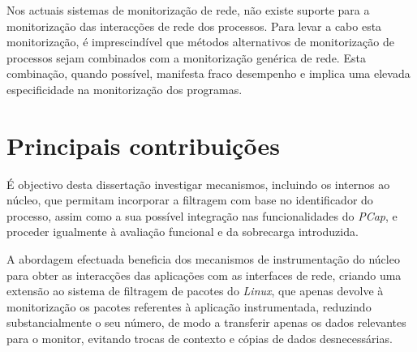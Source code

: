 Nos actuais sistemas de monitorização de rede, não existe suporte para a monitorização das interacções de rede dos processos.
Para levar a cabo esta monitorização, é imprescindível que métodos alternativos de monitorização de processos sejam combinados com a monitorização genérica de rede.
Esta combinação, quando possível, manifesta fraco desempenho e implica uma elevada especificidade na monitorização dos programas.



\section{Principais contribuições} 
\label{sec:intro_contribuicoes}

É objectivo desta dissertação investigar mecanismos, incluindo os internos ao núcleo, que permitam incorporar a filtragem com base no identificador do processo, assim como a sua possível integração nas funcionalidades do \textit{PCap}, e proceder igualmente à avaliação funcional e da sobrecarga introduzida.

A abordagem efectuada beneficia dos mecanismos de instrumentação do núcleo para obter as interacções das aplicações com as interfaces de rede, criando uma extensão ao sistema de filtragem de pacotes do \textit{Linux}, que apenas devolve à monitorização os pacotes referentes à aplicação instrumentada, reduzindo substancialmente o seu número, de modo a transferir apenas os dados relevantes para o monitor, evitando trocas de contexto e cópias de dados desnecessárias.

